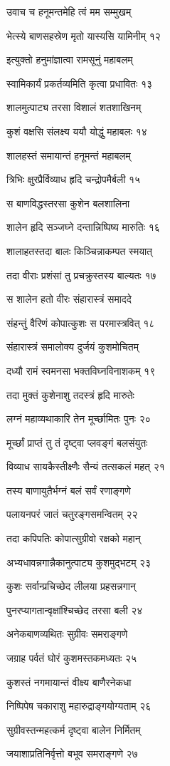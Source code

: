 उवाच च हनूमन्तमेहि त्वं मम सम्मुखम्

भेत्स्ये बाणसहस्रेण मृतो यास्यसि यामिनीम् १२

इत्युक्तो हनुमांज्ञात्वा रामसूनुं महाबलम्

स्वामिकार्यं प्रकर्तव्यमिति कृत्वा प्रधावितः १३

शालमुत्पाट्य तरसा विशालं शतशाखिनम्

कुशं वक्षसि संलक्ष्य ययौ योद्धुं महाबलः १४

शालहस्तं समायान्तं हनूमन्तं महाबलम्

त्रिभिः क्षुरप्रैर्विव्याध हृदि चन्द्रोपमैर्बली १५

स बाणविद्धस्तरसा कुशेन बलशालिना

शालेन हृदि सञ्जघ्ने दन्तान्निष्पिष्य मारुतिः १६

शालाहतस्तदा बालः किञ्चिन्नाकम्पत स्मयात्

तदा वीराः प्रशंसां तु प्रचक्रुस्तस्य बाल्यतः १७

स शालेन हतो वीरः संहारास्त्रं समाददे

संहन्तुं वैरिणं कोपात्कुशः स परमास्त्रवित् १८

संहारास्त्रं समालोक्य दुर्जयं कुशमोचितम्

दध्यौ रामं स्वमनसा भक्तविघ्नविनाशकम् १९

तदा मुक्तं कुशेनाशु तदस्त्रं हृदि मारुतेः

लग्नं महाव्यथाकारि तेन मूर्च्छामितः पुनः २०

मूर्च्छां प्राप्तं तु तं दृष्ट्वा प्लवङ्गं बलसंयुतः

विव्याध सायकैस्तीक्ष्णैः सैन्यं तत्सकलं महत् २१

तस्य बाणायुतैर्भग्नं बलं सर्वं रणाङ्गणे

पलायनपरं जातं चतुरङ्गसमन्वितम् २२

तदा कपिपतिः कोपात्सुग्रीवो रक्षको महान्

अभ्यधावन्नगान्नैकानुत्पाट्य कुशमुद्भटम् २३

कुशः सर्वान्प्रचिच्छेद लीलया प्रहसन्नगान्

पुनरप्यागतान्वृक्षांश्चिच्छेद तरसा बली २४

अनेकबाणव्यथितः सुग्रीवः समराङ्गणे

जग्राह पर्वतं घोरं कुशमस्तकमध्यतः २५

कुशस्तं नगमायान्तं वीक्ष्य बाणैरनेकधा

निष्पिपेष चकाराशु महारुद्राङ्गयोग्यताम् २६

सुग्रीवस्तन्महत्कर्म दृष्ट्वा बालेन निर्मितम्

जयाशाप्रतिनिर्वृत्तो बभूव समराङ्गणे २७

